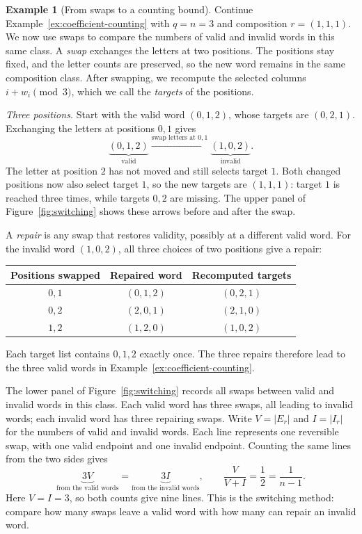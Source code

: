 \documentclass[11pt,a4paper]{article}
\numberwithin{equation}{section}
\numberwithin{figure}{section}
\numberwithin{table}{section}
\numberwithin{footnote}{section}
\theoremstyle{informal}\newtheorem*{informaltheorem}{Informal theorem}
\theoremstyle{definition}\newtheorem{example}{Example}[section]
\theoremstyle{remark}\newtheorem{remark}[theorem]{Remark}
\begin{document}
\begin{example}[From swaps to a counting bound]\label{ex:switching}
Continue Example~\ref{ex:coefficient-counting} with \(q=n=3\)
and composition \(r=(1,1,1)\). We now use swaps to compare the
numbers of valid and invalid words in this same class. A \emph{swap}
exchanges the letters at two positions. The positions stay fixed,
and the letter counts are preserved, so the new word remains in the
same composition class. After swapping, we recompute the selected
columns \(i+w_i\pmod3\), which we call the \emph{targets} of
the positions.

\emph{Three positions.}
Start with the valid word \((0,1,2)\), whose targets are
\((0,2,1)\). Exchanging the letters at positions \(0,1\) gives
\begin{equation}
 \underbrace{(0,1,2)}_{\text{valid}}
 \xrightarrow{\text{swap letters at }0,1}
 \underbrace{(1,0,2)}_{\text{invalid}}.
\end{equation}
The letter at position \(2\) has not moved and still selects
target \(1\). Both changed positions now also select target \(1\),
so the new targets are \((1,1,1)\): target \(1\) is reached
three times, while targets \(0,2\) are missing. The upper panel of
Figure~\ref{fig:switching} shows these arrows before and after the
swap.

A \emph{repair} is any swap that restores validity, possibly at a
different valid word. For the invalid word \((1,0,2)\),
all three choices of two positions give a repair:
\begin{center}
\renewcommand{\arraystretch}{1.1}
\begin{tabular}{@{}ccc@{}}
\toprule
Positions swapped & Repaired word & Recomputed targets \\
\midrule
\(0,1\) & \((0,1,2)\) & \((0,2,1)\) \\
\(0,2\) & \((2,0,1)\) & \((2,1,0)\) \\
\(1,2\) & \((1,2,0)\) & \((1,0,2)\) \\
\bottomrule
\end{tabular}
\end{center}
Each target list contains \(0,1,2\) exactly once. The three
repairs therefore lead to the three valid words in
Example~\ref{ex:coefficient-counting}.

The lower panel of Figure~\ref{fig:switching} records all swaps
between valid and invalid words in this class. Each valid word has
three swaps, all leading to invalid words; each invalid word has
three repairing swaps. Write \(V=|E_r|\) and \(I=|I_r|\) for
the numbers of valid and invalid words. Each line represents one reversible
swap, with one valid endpoint and one invalid endpoint. Counting
the same lines from the two sides gives
\begin{equation}
 \underbrace{3V}_{\text{from the valid words}}
 =\underbrace{3I}_{\text{from the invalid words}},
 \qquad \frac{V}{V+I}=\frac12=\frac1{n-1}.
\end{equation}
Here \(V=I=3\), so both counts give nine lines. This is the
switching method: compare how many swaps leave a valid word with
how many can repair an invalid word.


\end{example}
\end{document}
